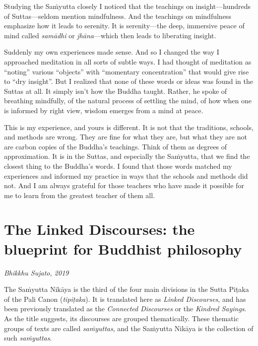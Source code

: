 \documentclass[12pt,openany]{book}%
\newcommand*{\scbyline}[1]{\begin{flushright}\textit{#1}\end{flushright}\bigskip}
\begin{document}
Studying the \textsanskrit{Saṁyutta} closely I noticed that the teachings on insight—hundreds of Suttas—seldom mention mindfulness. And the teachings on mindfulness emphasize how it leads to serenity. It is serenity—the deep, immersive peace of mind called \textit{\textsanskrit{samādhi}} or \textit{\textsanskrit{jhāna}}—which then leads to liberating insight. 

Suddenly my own experiences made sense. And so I changed the way I approached meditation in all sorts of subtle ways. I had thought of meditation as “noting” various “objects” with “momentary concentration” that would give rise to “dry insight”. But I realized that none of these words or ideas was found in the Suttas at all. It simply isn’t how the Buddha taught. Rather, he spoke of breathing mindfully, of the natural process of settling the mind, of how when one is informed by right view, wisdom emerges from a mind at peace.

This is my experience, and yours is different. It is not that the traditions, schools, and methods are wrong. They are fine for what they are, but what they are not are carbon copies of the Buddha’s teachings. Think of them as degrees of approximation. It is in the Suttas, and especially the \textsanskrit{Saṁyutta}, that we find the closest thing to the Buddha’s words. I found that those words matched my experiences and informed my practice in ways that the schools and methods did not. And I am always grateful for those teachers who have made it possible for me to learn from the greatest teacher of them all.

%
\chapter*{The Linked Discourses: the blueprint for Buddhist philosophy}

\scbyline{Bhikkhu Sujato, 2019}

The \textsanskrit{Saṁyutta} \textsanskrit{Nikāya} is the third of the four main divisions in the Sutta \textsanskrit{Piṭaka} of the Pali Canon (\textit{\textsanskrit{tipiṭaka}}). It is translated here as \textit{Linked Discourses}, and has been previously translated as the \textit{Connected Discourses} or the \textit{Kindred Sayings}. As the title suggests, its discourses are grouped thematically. These thematic groups of texts are called \textit{\textsanskrit{saṁyuttas}}, and the \textsanskrit{Saṁyutta} \textsanskrit{Nikāya} is the collection of such \textit{\textsanskrit{saṁyuttas}}.
\end{document}
